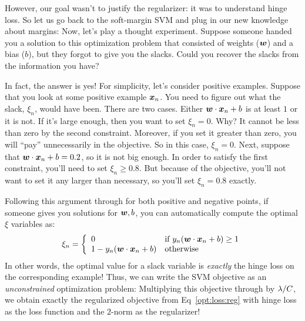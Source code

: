 However, our goal wasn't to justify the regularizer: it was to
understand hinge loss.  So let us go back to the soft-margin SVM and
plug in our new knowledge about margins:
%
%
Now, let's play a thought experiment.  Suppose someone handed you a
solution to this optimization problem that consisted of weights
(${\boldsymbol{w}}$) and a bias ($b$), but they forgot to give you the slacks.
Could you recover the slacks from the information you have?

In fact, the answer is yes!  For simplicity, let's consider positive
examples.  Suppose that you look at some positive example ${\boldsymbol{x}}_n$.
You need to figure out what the slack, $\xi_n$, would have been.
There are two cases.  Either ${\boldsymbol{w}} \cdot {\boldsymbol{x}}_n+b$ is at least $1$ or
it is not.  If it's large enough, then you want to set $\xi_n = 0$.
Why?  It cannot be less than zero by the second constraint.  Moreover,
if you set it greater than zero, you will ``pay'' unnecessarily in the
objective.  So in this case, $\xi_n=0$.  Next, suppose that
${\boldsymbol{w}} \cdot {\boldsymbol{x}}_n+b = 0.2$, so it is not big enough.  In order to
satisfy the first constraint, you'll need to set $\xi_n \geq 0.8$.
But because of the objective, you'll not want to set it any larger
than necessary, so you'll set $\xi_n = 0.8$ exactly.

Following this argument through for both positive and negative points,
if someone gives you solutions for ${\boldsymbol{w}},b$, you can automatically
compute the optimal $\xi$ variables as:
%
\begin{equation}
  \xi_n = \left\{\begin{array}{ll}
    0 & \text{if } y_n({\boldsymbol{w}} \cdot {\boldsymbol{x}}_n+b) \geq 1 \\
    1 - y_n({\boldsymbol{w}} \cdot {\boldsymbol{x}}_n+b) & \text{otherwise}\end{array}\right.
\end{equation}
%
In other words, the optimal value for a slack variable is
\emph{exactly} the hinge loss on the corresponding example!  Thus, we
can write the SVM objective as an \emph{unconstrained} optimization
problem:
%
%
Multiplying this objective through by $\lambda/C$, we obtain exactly the
regularized objective from Eq~\eqref{opt:loss:reg} with hinge loss as
the loss function and the $2$-norm as the regularizer!

